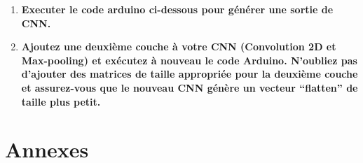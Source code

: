 \documentclass[a4paper, 12pt, openany]{book}
\begin{document}
\begin{enumerate}
{  } 
  \item {
    \textbf{Executer le code arduino ci-dessous pour générer une sortie de CNN.} \vspace{0.2cm} \\ 
  } 
  \item {
    \textbf{Ajoutez une deuxième couche à votre CNN (Convolution 2D et Max-pooling) et
    exécutez à nouveau le code Arduino. N'oubliez pas d'ajouter des matrices de taille
    appropriée pour la deuxième couche et assurez-vous que le nouveau CNN génère un
    vecteur ``flatten'' de taille plus petit.} \vspace{0.2cm} \\
  }

\end{enumerate}

\newpage

\appendix

\titleformat{\chapter}[hang]{\LARGE\bfseries}{\textcolor{titlecolor}{}}{0.5em}{\textcolor{titlecolor}}
\chapter{Annexes}\label{annexe}

\end{document}
